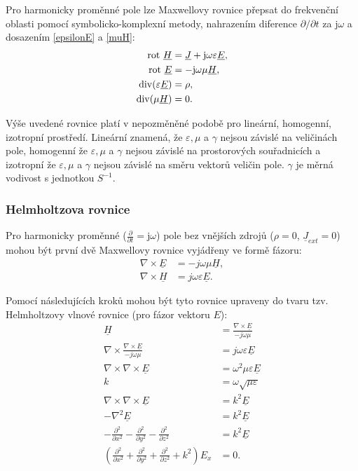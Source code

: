\documentclass[12pt,a4paper,oneside]{article}
\numberwithin{equation}{section} %
\numberwithin{figure}{section} %
\numberwithin{table}{section} %
\newcommand{\mj}{\mathrm{j}} %
\newcommand{\faz}[1]{{\underline{#1}}} %
\newcommand{\rot}{\mathrm{rot}\ }
\begin{document}
Pro harmonicky proměnné pole lze Maxwellovy rovnice přepsat do frekvenční oblasti pomocí symbolicko-komplexní metody, nahrazením diference $\partial / \partial t$ za $\mj \omega$ a dosazením \ref{epsilonE} a \ref{muH}:
\begin{subequations}
\begin{align}
\rot \faz{H} &= \faz{J} + \mj \omega \varepsilon \faz{E},
\\
\rot \faz{E} &= - \mj \omega \mu \faz{H},
\\
\udiv (\varepsilon \faz{E}) &= \rho,
\\
\udiv (\mu \faz{H}) &= 0.
\end{align}
\end{subequations}

Výše uvedené rovnice platí v nepozměněné podobě pro lineární, homogenní, izotropní prostředí. Lineární znamená, že $\varepsilon , \mu$ a $\gamma$ nejsou závislé na veličinách pole, homogenní že $\varepsilon , \mu$ a $\gamma$ nejsou závislé na prostorových souřadnicích a izotropní že $\varepsilon , \mu$ a $\gamma$ nejsou závislé na směru vektorů veličin pole. $\gamma$ je měrná vodivost s jednotkou $S ^{-1}$.

\subsubsection*{Helmholtzova rovnice}
Pro harmonicky proměnné ($\frac{\partial}{\partial t} = \mj \omega$) pole bez vnějších zdrojů ($\rho = 0$, $\faz{J} _{ext} = 0$) mohou být první dvě Maxwellovy rovnice vyjádřeny ve formě fázoru:
\begin{subequations}
\label{maxvektor}
\begin{align}
\nabla \times \faz{E} &= -j\omega \mu \faz{H} ,
\\
\nabla \times \faz{H} &= j\omega \varepsilon \faz{E} .
\end{align}
\end{subequations}


Pomocí následujících kroků mohou být tyto rovnice upraveny do tvaru tzv. Helmholtzovy vlnové rovnice (pro fázor vektoru $E$):
\begin{subequations}
\label{helmholtz}
\begin{align}
\faz{H} &= \frac{\nabla \times \faz{E}}{-j \omega \mu}
\\
\nabla \times \frac{\nabla \times \faz{E}}{-j \omega \mu} &= j \omega \varepsilon \faz{E}
\\
\nabla \times \nabla \times \faz{E} &= \omega ^2 \mu \varepsilon \faz{E}
\\
k &= \omega \sqrt{\mu \varepsilon}
\\
\nabla \times \nabla \times \faz{E} &= k^2 \faz{E}
\\
\label{helmhomo}
- \nabla ^2 \faz{E} &= k^2 \faz{E}
\\
- \frac{\partial ^2}{\partial x^2} - \frac{\partial ^2}{\partial y^2} - \frac{\partial ^2}{\partial z^2} &= k^2 \faz{E}
\\
\left( \frac{\partial ^2}{\partial x^2} + \frac{\partial ^2}{\partial y^2} + \frac{\partial ^2}{\partial z^2} + k^2 \right) E_x &= 0 .
\end{align}
\end{subequations}
\end{document}
